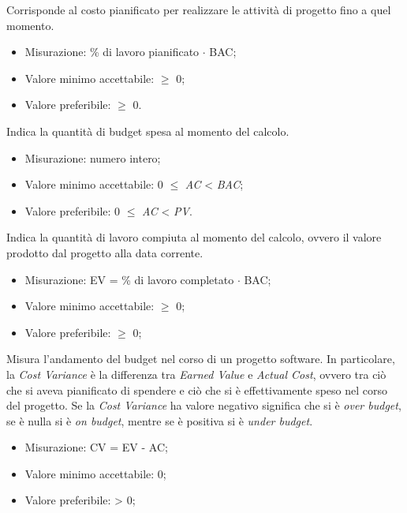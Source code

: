 		Corrisponde al costo pianificato per realizzare le attività di progetto fino a quel momento.
		\begin{itemize}
			\item{Misurazione: \% di lavoro pianificato $\cdot$ BAC;}
			\item{Valore minimo accettabile: $\geq$ 0;}
			\item{Valore preferibile: $\geq$ 0.}
		\end{itemize}
		
		Indica la quantità di budget spesa al momento del calcolo.
		\begin{itemize}
			\item{Misurazione: numero intero;}
			\item{Valore minimo accettabile: 0 $\leq$ \textit{AC} < \textit{BAC};}
			\item{Valore preferibile: 0 $\leq$ \textit{AC} < \textit{PV}.}
		\end{itemize}
		
		Indica la quantità di lavoro compiuta al momento del calcolo, ovvero il valore prodotto dal progetto alla data corrente.
		\begin{itemize}
			\item{Misurazione: EV =  \% di lavoro completato $\cdot$ BAC;}
			\item{Valore minimo accettabile: $\geq$ 0;}
			\item{Valore preferibile: $\geq$ 0;}
		\end{itemize}

		Misura l'andamento del budget nel corso di un progetto software. In particolare, la \textit{Cost Variance} è la differenza tra \textit{Earned Value} e \textit{Actual Cost}, ovvero tra ciò che si aveva pianificato di spendere e ciò che si è effettivamente speso nel corso del progetto.
		Se la \textit{Cost Variance} ha valore negativo significa che si è \textit{over budget}, se è nulla si è \textit{on budget}, mentre se è positiva si è \textit{under budget}.
		\begin{itemize}
			\item{Misurazione: CV = EV - AC;}
			\item{Valore minimo accettabile: 0;}
			\item{Valore preferibile: > 0;}
		\end{itemize}
		
